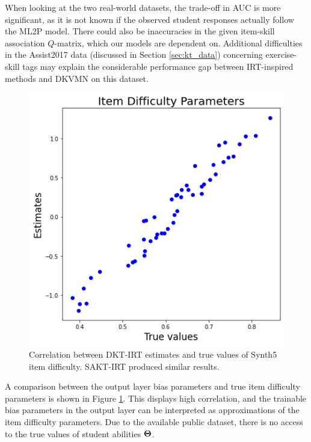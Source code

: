 When looking at the two real-world datasets, the trade-off in AUC is more significant, as it is not known if the observed student responses actually follow the ML2P model. There could also be inaccuracies in the given item-skill association $Q$-matrix, which our models are dependent on. Additional difficulties in the Assist2017 data (discussed in Section \ref{sec:kt_data}) concerning exercise-skill tags may explain the considerable performance gap between IRT-inspired methods and DKVMN on this dataset.

\begin{figure}[h]
  \centering
  \includegraphics[width=.5\textwidth]{img/kt_irt/synth5_diff_est_lstm.png}
  \caption{Correlation between DKT-IRT estimates and true values of Synth5 item difficulty. SAKT-IRT produced similar results.}
  \label{fig:synth5_diff}
\end{figure}

A comparison between the output layer bias parameters and true item difficulty parameters is shown in Figure \ref{fig:synth5_diff}. This displays high correlation, and the trainable bias parameters in the output layer can be interpreted as approximations of the item difficulty parameters. Due to the available public dataset, there is no access to the true values of student abilities $\boldsymbol{\Theta}$.


